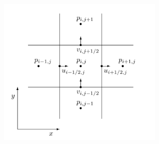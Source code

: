 \begin{figure}[ht] 
 \centering
 \includegraphics[width=8cm]{image/mac.png}
 \label{fig:mac}
\end{figure}

